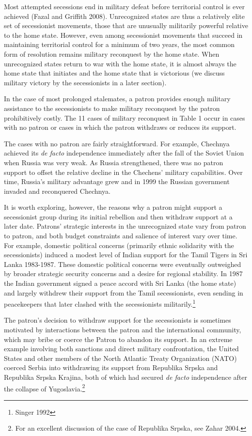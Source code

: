 \documentclass[12pt,letterpaper, notitlepage]{article}
\begin{document}
Most attempted secessions end in military defeat before territorial control is ever achieved (Fazal and Griffith 2008). Unrecognized states are thus a relatively elite set of secessionist movements, those that are unusually militarily powerful relative to the home state. However, even among secessionist movements that succeed in maintaining territorial control for a minimum of two years, the most common form of resolution remains military reconquest by the home state. When unrecognized states return to war with the home state, it is almost always the home state that initiates and the home state that is victorious (we discuss military victory by the secessionists in a later section).

In the case of most prolonged stalemates, a patron provides enough military assistance to the secessionists to make military reconquest by the patron prohibitively costly.  The 11 cases of military reconquest in Table 1 occur in cases with no patron or cases in which the patron withdraws or reduces its support.  

The cases with no patron are fairly straightforward. For example, Chechnya achieved its \emph{de facto} independence immediately after the fall of the Soviet Union when Russia was very weak.   As Russia strengthened, there was no patron support to offset the relative decline in the Chechens' military capabilities. Over time, Russia's military advantage grew and in 1999 the Russian government invaded and reconquered Chechnya.

It is worth exploring, however, the reasons why a patron might support a secessionist group during its initial rebellion and then withdraw support at a later date. Patrons' strategic interests in the unrecognized state vary from patron to patron, and both budget constraints and salience of interest vary over time. For example, domestic political concerns (primarily ethnic solidarity with the secessionists) induced a modest level of Indian support for the Tamil Tigers in Sri Lanka 1983-1987.  These domestic political concerns were eventually outweighed by broader strategic security concerns and a desire for regional stability. In 1987 the Indian government signed a peace accord with Sri Lanka (the home state) and largely withdrew their support from the Tamil secessionists, even sending in peacekeepers that later clashed with the secessionists militarily.\footnote{Singer 1992}

The patron's decision to withdraw support for the secessionists is sometimes motivated by interactions between the patron and the international community, which may bribe or coerce the Patron to abandon its support. In an extreme example involving both sanctions and direct military confrontation, the United States and other members of the North Atlantic Treaty Organization (NATO) coerced Serbia into withdrawing its support from Republika Srpska and Republika Srpska Krajina, both of which had secured \emph{de facto} independence after the collapse of Yugoslavia.\footnote{For an excellent discussion of the case of Republika Srpska, see Zahar 2004.} 
\end{document}

